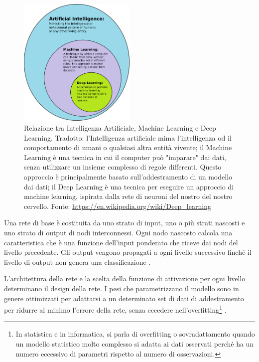 \begin{figure}[H]
    \centering
    \includegraphics[width=0.5\textwidth]{images/chapter2/AI-ML-DL.jpg}
    \caption[Relazione tra IA, ML e DL.]{Relazione tra Intelligenza Artificiale, Machine Learning e Deep Learning. Tradotto: l'Intelligenza artificiale mima l'intelligenza od il comportamento di umani o qualsiasi altra entità vivente; il Machine Learning è una tecnica in cui il computer può "imparare" dai dati, senza utilizzare un insieme complesso di regole differenti. Questo approccio è principalmente basato sull'addestramento di un modello dai dati; il Deep Learning è una tecnica per eseguire un approccio di machine learning, ispirata dalla rete di neuroni del nostro del nostro cervello. Fonte: \url{https://en.wikipedia.org/wiki/Deep_learning}}
    \label{fig:ai_ml_dl}
\end{figure}

Una rete di base è costituita da uno strato di input, uno o più strati nascosti e uno strato di output di nodi interconnessi. Ogni nodo nascosto calcola una caratteristica che è una funzione dell'input ponderato che riceve dai nodi del livello precedente. Gli output vengono propagati a ogni livello successivo finché il livello di output non genera una classificazione \cite{ragoza_protein-ligand_2017}.

L'architettura della rete e la scelta della funzione di attivazione per ogni livello determinano il design della rete. I pesi che parametrizzano il modello sono in genere ottimizzati per adattarsi a un determinato set di dati di addestramento per ridurre al minimo l'errore della rete, senza eccedere nell'overfitting\footnote{In statistica e in informatica, si parla di overfitting o sovradattamento quando un modello statistico molto complesso si adatta ai dati osservati perché ha un numero eccessivo di parametri rispetto al numero di osservazioni. } \cite{ragoza_protein-ligand_2017}.

